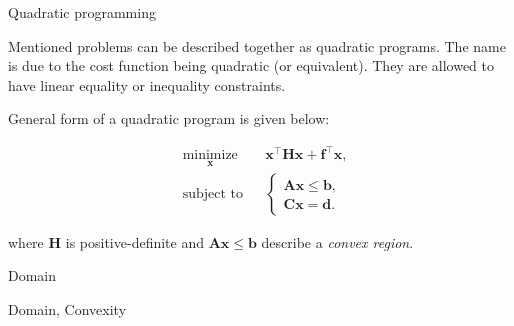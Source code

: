 \documentclass{beamer}
\begin{document}
\begin{frame}{Quadratic programming}
\begin{flushleft}

Mentioned problems can be described together as quadratic programs. The name is due to the cost function being quadratic (or equivalent). They are allowed to have linear equality or inequality constraints. 

\bigskip

General form of a quadratic program is given below:

%
\begin{equation}
\begin{aligned}
& \underset{\mathbf{x}}{\text{minimize}}
& & \mathbf{x}^\top \mathbf{H} \mathbf{x} + \mathbf{f}^\top\mathbf{x}, \\
& \text{subject to}
& & \begin{cases}
    \mathbf{A}\mathbf{x} \leq \mathbf{b}, \\
    \mathbf{C}\mathbf{x} = \mathbf{d}.
    \end{cases}
\end{aligned}
\end{equation}

where $\mathbf{H}$ is positive-definite and $\mathbf{A}\mathbf{x} \leq \mathbf{b}$ describe a \emph{convex region}.

\end{flushleft}
\end{frame}




\begin{frame}{Domain}
	\begin{flushleft}
		
		\centerline{Domain, Convexity}
		
	\end{flushleft}
\end{frame}
\end{document}
